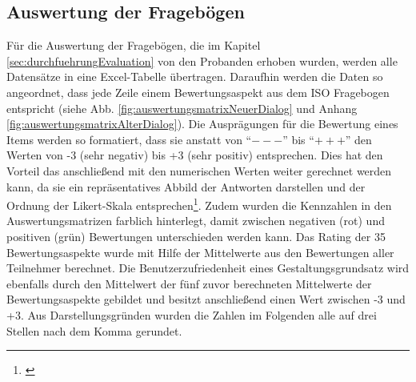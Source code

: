 \subsection{Auswertung der Fragebögen}
\label{sec:auswertungDerFrageboegen}
Für die Auswertung der Fragebögen, die im Kapitel \ref{sec:durchfuehrungEvaluation} von den Probanden erhoben wurden, werden alle Datensätze in eine Excel-Tabelle übertragen. Daraufhin werden die Daten so angeordnet, dass jede Zeile einem Bewertungsaspekt aus dem ISO Fragebogen entspricht (siehe Abb. \ref{fig:auswertungsmatrixNeuerDialog} und Anhang \ref{fig:auswertungsmatrixAlterDialog}). Die Ausprägungen für die Bewertung eines Items werden so formatiert, dass sie anstatt von \enquote{$---$} bis \enquote{$+++$} den Werten von -3 (sehr negativ) bis +3 (sehr positiv) entsprechen. Dies hat den Vorteil das anschließend mit den numerischen Werten weiter gerechnet werden kann, da sie ein repräsentatives Abbild der Antworten darstellen und der Ordnung der Likert-Skala entsprechen\footnote{\cite[vgl.][]{Statista}}. Zudem wurden die Kennzahlen in den Auswertungsmatrizen farblich hinterlegt, damit zwischen negativen (rot) und positiven (grün) Bewertungen unterschieden werden kann. Das Rating der 35 Bewertungsaspekte wurde mit Hilfe der Mittelwerte aus den Bewertungen aller Teilnehmer berechnet. Die Benutzerzufriedenheit eines Gestaltungsgrundsatz wird ebenfalls durch den Mittelwert der fünf zuvor berechneten Mittelwerte der Bewertungsaspekte gebildet und besitzt anschließend einen Wert zwischen -3 und +3. Aus Darstellungsgründen wurden die Zahlen im Folgenden alle auf drei Stellen nach dem Komma gerundet.


